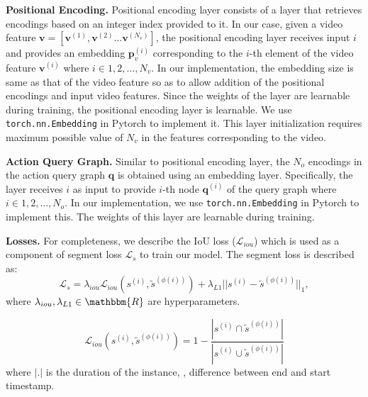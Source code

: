 \documentclass[10pt,twocolumn,letterpaper]{article}
\begin{document}
\vspace{0.05in}
\noindent
\textbf{Positional Encoding. }Positional encoding layer consists of a layer that retrieves encodings based on an integer index provided to it. In our case, given a video feature $\mathbf{v} = [\mathbf{v}^{(1)},\mathbf{v}^{(2)} \ldots \mathbf{v}^{(N_v)}]$, the positional encoding layer receives input $i$ and provides an embedding $\mathbf{p}_v^{(i)}$ corresponding to the $i$-th element of the video feature $\mathbf{v}^{(i)}$ where $i \in {1,2,\ldots,N_v}$. In our implementation, the embedding size is same as that of the video feature so as to allow addition of the positional encodings and input video features. Since the weights of the layer are learnable during training, the positional encoding layer is learnable. We use \texttt{torch.nn.Embedding} in Pytorch to implement it. This layer initialization requires maximum possible value of $N_v$ in the features corresponding to the video.

\vspace{0.05in}
\noindent
\textbf{Action Query Graph. }Similar to positional encoding layer, the $N_o$ encodings in the action query graph $\mathbf{q}$ is obtained using an embedding layer. Specifically, the layer receives $i$ as input to provide $i$-th node $\mathbf{q}^{(i)}$ of the query graph where $i \in {1,2,\ldots,N_o}$. In our implementation, we use \texttt{torch.nn.Embedding} in Pytorch to implement this. The weights of this layer are learnable during training.


\vspace{0.05in}
\noindent
\textbf{Losses. }For completeness, we describe the IoU loss ($\mathcal{L}_{iou}$) which is used as a component of segment loss $\mathcal{L}_s$ to train our model. The segment loss is described as:
\begin{equation}
    \mathcal{L}_s = \lambda_{iou} \mathcal{L}_{iou}(s^{(i)}, \tilde s^{(\phi(i))})
     + \lambda_{L1} ||s^{(i)} - \tilde s^{(\phi(i))}||_{1} ,
\end{equation}
where $\lambda_{iou}, \lambda_{L1} \in \mathbbm{R}$ are hyperparameters.

\begin{equation}
     \mathcal{L}_{iou}(s^{(i)}, \tilde s^{(\phi(i))}) = 1 - \frac{|s^{(i)} \cap \tilde s^{(\phi(i))}|}{|s^{(i)} \cup \tilde s^{(\phi(i))}|}
\end{equation}
 where $|.|$ is the duration of the instance, \ie, difference between end and start timestamp.
\end{document}
